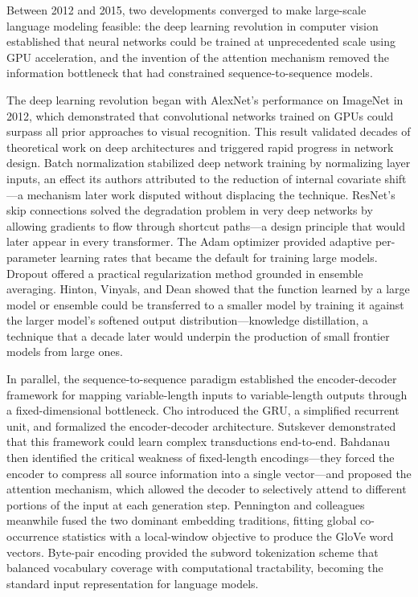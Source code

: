 
Between 2012 and 2015, two developments converged to make large-scale language modeling feasible: the deep learning revolution in computer vision established that neural networks could be trained at unprecedented scale using GPU acceleration, and the invention of the attention mechanism removed the information bottleneck that had constrained sequence-to-sequence models.

The deep learning revolution began with AlexNet's performance on ImageNet in 2012, which demonstrated that convolutional networks trained on GPUs could surpass all prior approaches to visual recognition. This result validated decades of theoretical work on deep architectures and triggered rapid progress in network design. Batch normalization stabilized deep network training by normalizing layer inputs, an effect its authors attributed to the reduction of internal covariate shift---a mechanism later work disputed without displacing the technique. ResNet's skip connections solved the degradation problem in very deep networks by allowing gradients to flow through shortcut paths---a design principle that would later appear in every transformer. The Adam optimizer provided adaptive per-parameter learning rates that became the default for training large models. Dropout offered a practical regularization method grounded in ensemble averaging. Hinton, Vinyals, and Dean showed that the function learned by a large model or ensemble could be transferred to a smaller model by training it against the larger model's softened output distribution---knowledge distillation, a technique that a decade later would underpin the production of small frontier models from large ones.

In parallel, the sequence-to-sequence paradigm established the encoder-decoder framework for mapping variable-length inputs to variable-length outputs through a fixed-dimensional bottleneck. Cho introduced the GRU, a simplified recurrent unit, and formalized the encoder-decoder architecture. Sutskever demonstrated that this framework could learn complex transductions end-to-end. Bahdanau then identified the critical weakness of fixed-length encodings---they forced the encoder to compress all source information into a single vector---and proposed the attention mechanism, which allowed the decoder to selectively attend to different portions of the input at each generation step. Pennington and colleagues meanwhile fused the two dominant embedding traditions, fitting global co-occurrence statistics with a local-window objective to produce the GloVe word vectors. Byte-pair encoding provided the subword tokenization scheme that balanced vocabulary coverage with computational tractability, becoming the standard input representation for language models.

